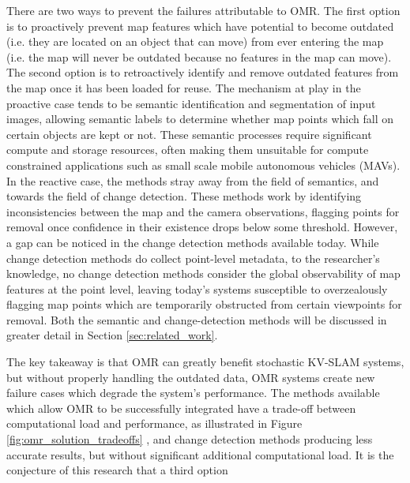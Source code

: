 There are two ways to prevent the failures attributable to OMR. The first option is to proactively prevent map features which have potential to become outdated (i.e. they are located on an object that can move) from ever entering the map (i.e. the map will never be outdated because no features in the map can move). The second option is to retroactively identify and remove outdated features from the map once it has been loaded for reuse. The mechanism at play in the proactive case tends to be semantic identification and segmentation of input images, allowing semantic labels to determine whether map points which fall on certain objects are kept or not. These semantic processes require significant compute and storage resources, often making them unsuitable for compute constrained applications such as small scale mobile autonomous vehicles (MAVs). In the reactive case, the methods stray away from the field of semantics, and towards the field of change detection. These methods work by identifying inconsistencies between the map and the camera observations, flagging points for removal once confidence in their existence drops below some threshold. However, a gap can be noticed in the change detection methods available today. While change detection methods do collect point-level metadata, to the researcher's knowledge, no change detection methods consider the global observability of map features at the point level, leaving today's systems susceptible to overzealously flagging map points which are temporarily obstructed from certain viewpoints for removal. Both the semantic and change-detection methods will be discussed in greater detail in Section \ref{sec:related_work}.

The key takeaway is that OMR can greatly benefit stochastic KV-SLAM systems, but without properly handling the outdated data, OMR systems create new failure cases which degrade the system's performance. The methods available which allow OMR to be successfully integrated have a trade-off between computational load and performance, as illustrated in Figure \ref{fig:omr_solution_tradeoffs} , and change detection methods producing less accurate results, but without significant additional computational load.  It is the conjecture of this research that a third option